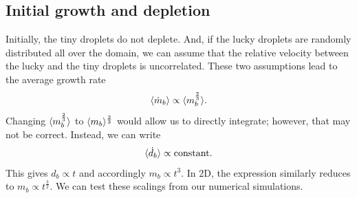 \documentclass[../Rajarshi-thesis-draft.tex]{subfiles}
\begin{document}
\subsection{Initial growth and depletion}\label{early-sc}
Initially, the tiny droplets do not deplete. And, if the lucky droplets are randomly distributed all over the domain, we can assume that the relative velocity between the lucky and the tiny droplets is uncorrelated. These two assumptions lead to the average growth rate
\begin{align}
\begin{split}
        \langle \dot{m}_b\rangle \propto \langle m_b^{\frac23}\rangle.
\end{split}
\end{align}
Changing $\langle m_b^{\frac23}\rangle$ to $\langle m_b\rangle^{\frac23}$ would allow us to directly integrate; however, that may not be correct. Instead, we can write
\begin{align}
\begin{split}
    \langle \dot{d}_b\rangle \propto \text{constant}. 
\end{split}
\end{align}
This gives $d_b \propto t$ and accordingly $m_b \propto t^3$. In $2$D, the expression similarly reduces to $m_b \propto t^\frac32$. We can test these scalings from our numerical simulations.
\end{document}
